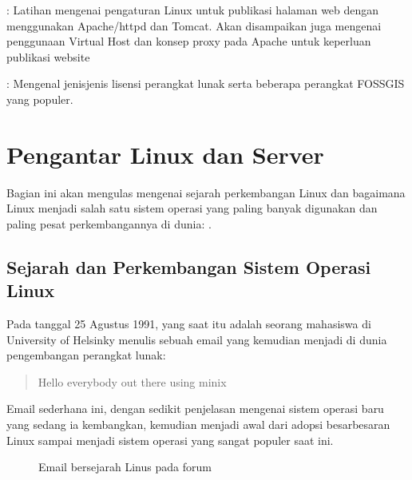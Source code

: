 \documentclass[letterpaper,10pt,english]{sphinxmanual}
\let\sphinxpxdimen\pdfpxdimen\else\newdimen\sphinxpxdimen
\begin{document}
 {\hyperref[\detokenize{sesi1/linuxserver::doc}]{}}
: Latihan mengenai pengaturan Linux untuk publikasi halaman web dengan menggunakan Apache/httpd dan Tomcat. Akan disampaikan juga mengenai penggunaan Virtual Host dan konsep proxy pada Apache untuk keperluan publikasi website

 {\hyperref[\detokenize{sesi1/fossgis::doc}]{}}
: Mengenal jenis\sphinxhyphen{}jenis lisensi perangkat lunak serta beberapa perangkat FOSS\sphinxhyphen{}GIS yang populer.


\section{Pengantar Linux dan Server}
\label{\detokenize{sesi1/pengantarlinux:pengantar-linux-dan-server}}\label{\detokenize{sesi1/pengantarlinux::doc}}
Bagian ini akan mengulas mengenai sejarah perkembangan Linux dan bagaimana Linux menjadi salah satu sistem operasi yang paling banyak digunakan dan paling pesat perkembangannya di dunia: .


\subsection{Sejarah dan Perkembangan Sistem Operasi Linux}
\label{\detokenize{sesi1/pengantarlinux:sejarah-dan-perkembangan-sistem-operasi-linux}}
Pada tanggal 25 Agustus 1991,  yang saat itu adalah seorang mahasiswa di University of Helsinky menulis sebuah email yang kemudian menjadi  di dunia pengembangan perangkat lunak:
\begin{quote}

Hello everybody out there using minix \sphinxhyphen{}
\end{quote}

Email sederhana ini, dengan sedikit penjelasan mengenai sistem operasi baru yang sedang ia kembangkan, kemudian menjadi awal dari adopsi besar\sphinxhyphen{}besaran Linux sampai menjadi sistem operasi yang sangat populer saat ini.

\begin{figure}[htbp]
\centering
\capstart

\noindent\sphinxincludegraphics[height=500\sphinxpxdimen]{{2020-12-01-22-47-51}.png}
\caption{Email bersejarah Linus pada forum }\label{\detokenize{sesi1/pengantarlinux:linus-email}}\end{figure}
\end{document}
